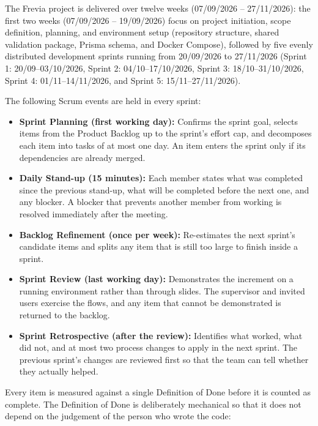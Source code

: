 The Frevia project is delivered over twelve weeks (07/09/2026 -- 27/11/2026): the first two weeks (07/09/2026 -- 19/09/2026) focus on project initiation, scope definition, planning, and environment setup (repository structure, shared validation package, Prisma schema, and Docker Compose), followed by five evenly distributed development sprints running from 20/09/2026 to 27/11/2026 (Sprint 1: 20/09--03/10/2026, Sprint 2: 04/10--17/10/2026, Sprint 3: 18/10--31/10/2026, Sprint 4: 01/11--14/11/2026, and Sprint 5: 15/11--27/11/2026).

The following Scrum events are held in every sprint:

\begin{itemize}
\item \textbf{Sprint Planning (first working day):} Confirms the sprint goal, selects items from the Product Backlog up to the sprint's effort cap, and decomposes each item into tasks of at most one day. An item enters the sprint only if its dependencies are already merged.

\item \textbf{Daily Stand-up (15 minutes):} Each member states what was completed since the previous stand-up, what will be completed before the next one, and any blocker. A blocker that prevents another member from working is resolved immediately after the meeting.

\item \textbf{Backlog Refinement (once per week):} Re-estimates the next sprint's candidate items and splits any item that is still too large to finish inside a sprint.

\item \textbf{Sprint Review (last working day):} Demonstrates the increment on a running environment rather than through slides. The supervisor and invited users exercise the flows, and any item that cannot be demonstrated is returned to the backlog.

\item \textbf{Sprint Retrospective (after the review):} Identifies what worked, what did not, and at most two process changes to apply in the next sprint. The previous sprint's changes are reviewed first so that the team can tell whether they actually helped.
\end{itemize}

Every item is measured against a single Definition of Done before it is counted as complete. The Definition of Done is deliberately mechanical so that it does not depend on the judgement of the person who wrote the code:

